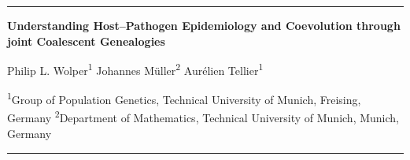 \documentclass[a0paper,portrait,20pt]{extarticle}
\begin{document}

\hrule

\begin{tcolorbox}[titlebox]
\begin{center}
  {\fontsize{65}{90}\selectfont\bfseries\color{white}%
    Understanding Host--Pathogen Epidemiology and Coevolution through joint Coalescent Genealogies\par}
  \vspace{1cm}

  {\fontsize{42}{55}\selectfont\color{white}%
   Philip L. Wolper\textsuperscript{1}\qquad
   Johannes Müller\textsuperscript{2}\qquad
   Aurélien Tellier\textsuperscript{1}\par}
  \vspace{1cm}
 
  {\fontsize{28}{34}\selectfont\color{white}%
   \textsuperscript{1}Group of Population Genetics, Technical University of Munich, Freising, Germany
   \qquad
   \textsuperscript{2}Department of Mathematics, Technical University of Munich, Munich, Germany}
\end{center}
\end{tcolorbox}

\vspace{0.4cm}
\hrule
\vspace{1cm}

\fontsize{28}{34}\selectfont
\end{document}
